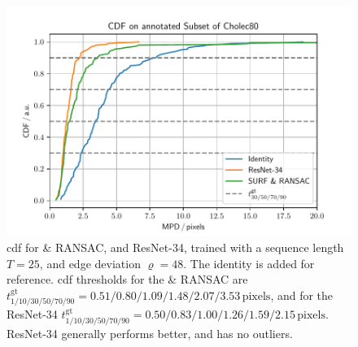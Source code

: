\begin{figure}[tb]
\centering
\includegraphics[width=\textwidth]{fig/frac/cdf.pdf}
\caption{\gls{cdf} for  \& RANSAC, and ResNet-34, trained with a sequence length $T=25$, and edge deviation $\varrho=48$. The identity is added for reference. \gls{cdf} thresholds for the  \& RANSAC are $t^\text{gt}_{1/10/30/50/70/90} = 0.51/0.80/1.09/1.48/2.07/3.53\,\text{pixels}$, and for the ResNet-34 $t^\text{gt}_{1/10/30/50/70/90} = 0.50/0.83/1.00/1.26/1.59/2.15\,\text{pixels}$. ResNet-34 generally performs better, and has no outliers.}
\label{c3:fig:resnet34_c}
\end{figure}


